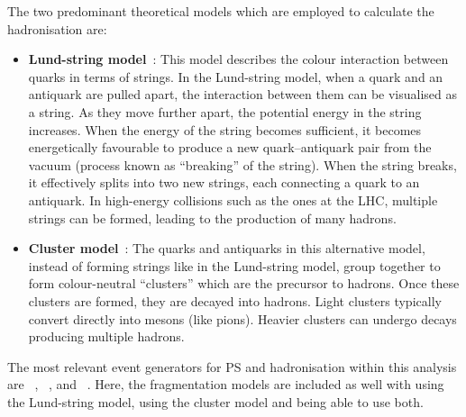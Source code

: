 The two predominant theoretical models which are employed to calculate the hadronisation are:
\begin{itemize}
	\item \textbf{Lund-string model}~\cite{Andersson:1983ia, Sjostrand:1986hx}: 
		This model describes the colour interaction between quarks in terms 
		of strings. In the Lund-string model, when a quark and an antiquark are pulled apart, the 
		interaction between them can be visualised as a string. As they move further apart, 
		the potential energy in the string increases. When the energy of the string becomes 
		sufficient, it becomes energetically favourable to produce a new quark--antiquark pair 
		from the vacuum (process known as ``breaking'' of the string). When the string breaks, 
		it effectively splits into two new strings, each connecting a quark to an antiquark.
		In high-energy collisions such as the ones at the LHC, multiple strings can be formed, 
		leading to the production of many hadrons.

	\item \textbf{Cluster model}~\cite{Borozan:2002fk}: The quarks and antiquarks in this alternative model, 
		instead of forming strings like in the Lund-string model, group together to form 
		colour-neutral ``clusters'' which are the precursor to hadrons. 
		Once these clusters are formed, they are decayed into hadrons.
		Light clusters typically convert directly into mesons (like pions). 
		Heavier clusters can undergo decays producing multiple hadrons.
\end{itemize} 

The most relevant event generators for PS and hadronisation within this analysis are \Herwig~\cite{Bahr:2008pv}, 
\Pythia~\cite{Sjostrand:2014zea}, and \Sherpa~\cite{Gleisberg:2008ta}. Here, the fragmentation models
are included as well with \Pythia using the Lund-string model, \Herwig using the cluster model and
\Sherpa being able to use both.

\begin{comment}
\subsubsection{Soft QCD components, decays and QED radiation}
\label{sec:Chap3.1:MC:Steps:soft}
Following the evolution of the PS, the event generation-process continues with the 
incorporation of soft-QCD phenomena, decays of unstable particles, and QED 
radiation. This encompasses the UE (described in Section~\ref{sec:Chap1:PhenoOfPP:UE}) 
generation and the hadronisation process, both of which are based on models that 
cannot be deduced from fundamental principles due to their occurrence at low scales, 
where the strong-perturbation series becomes unreliable. 
\end{comment}

